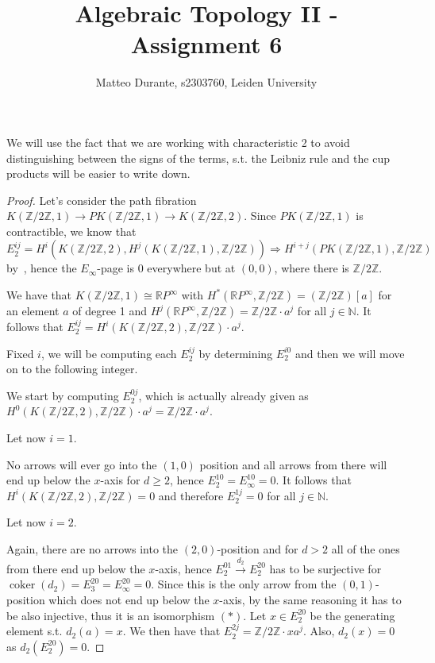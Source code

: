 \documentclass{article}
\newcommand{\numberset}{\mathbb}
\newcommand{\N}{\numberset{N}}
\newcommand{\Z}{\numberset{Z}}
\newcommand{\R}{\numberset{R}}
\newcommand{\RP}{\R P^\infty}
\newcommand{\exercise}[1]{\noindent {\bf Exercise #1}}
\DeclareMathOperator{\coker}{coker}
\begin{document}
\title{Algebraic Topology II - Assignment 6}

\author{Matteo Durante, s2303760, Leiden University}

\maketitle

\exercise{2}

    We will use the fact that we are working with characteristic 2 to avoid
    distinguishing between the signs of the terms, s.t. the Leibniz rule and the
    cup products will be easier to write down.

\begin{proof}
    Let's consider the path fibration $K(\Z/2\Z,1)\rightarrow
    PK(\Z/2\Z,1)\rightarrow K(\Z/2\Z,2)$. Since $PK(\Z/2\Z,1)$ is contractible,
    we know that $E^{ij}_2=H^i(K(\Z/2\Z,2),H^j(K(\Z/2\Z,1),\Z/2\Z))\Rightarrow
    H^{i+j}(PK(\Z/2\Z,1),\Z/2\Z)$ by~\cite[thm. 9.5]{HM19}, hence the
    $E_\infty$-page is 0 everywhere but at $(0,0)$, where there is $\Z/2\Z$.

    We have that $K(\Z/2\Z,1)\cong\RP$ with $H^*(\RP,\Z/2\Z)=(\Z/2\Z)[a]$ for an
    element $a$ of degree 1 and $H^j(\RP,\Z/2\Z)=\Z/2\Z\cdot a^j$ for all
    $j\in\N$. It follows that $E^{ij}_2=H^i(K(\Z/2\Z,2),\Z/2\Z)\cdot a^j$.

    Fixed $i$, we will be computing each $E^{ij}_2$ by determining $E^{i0}_2$
    and then we will move on to the following integer.

    We start by computing $E^{0j}_2$, which is actually already given as
    $H^0(K(\Z/2\Z,2),\Z/2\Z)\cdot a^j=\Z/2\Z\cdot a^j$.

    Let now $i=1$.
    
    No arrows will ever go into the $(1,0)$ position and all arrows from there
    will end up below the $x$-axis for $d\geq 2$, hence
    $E^{10}_2=E^{10}_\infty=0$. It follows that $H^i(K(\Z/2\Z,2),\Z/2\Z)=0$ and
    therefore $E^{1j}_2=0$ for all $j\in\N$.

    Let now $i=2$.

    Again, there are no arrows into the $(2,0)$-position and for $d>2$ all of
    the ones from there end up below the $x$-axis, hence
    $E^{01}_2\xrightarrow{d_2}E^{20}_2$ has to be surjective for
    $\coker(d_2)=E^{20}_3=E^{20}_\infty=0$. Since this is the only arrow from
    the $(0,1)$-position which does not end up below the $x$-axis, by the same
    reasoning it has to be also injective,
    thus it is an isomorphism $(*)$. Let $x\in E^{20}_2$ be the generating
    element s.t. $d_2(a)=x$. We then have that $E^{2j}_2=\Z/2\Z\cdot xa^j$.
    Also, $d_2(x)=0$ as $d_2(E^{20}_2)=0$.
    

\end{proof}
\end{document}
